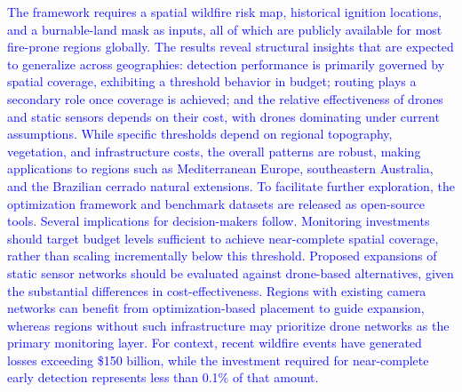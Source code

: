 \documentclass[pdflatex,sn-mathphys-num]{sn-jnl}%
\theoremstyle{thmstyleone}%
\theoremstyle{thmstyletwo}%
\theoremstyle{thmstylethree}%
\newcommand{\blue}[1]{\textcolor{blue}{#1}}
\begin{document}
\blue{The framework requires a spatial wildfire risk map, historical ignition locations, and a burnable-land mask as inputs, all of which are publicly available for most fire-prone regions globally. The results reveal structural insights that are expected to generalize across geographies: detection performance is primarily governed by spatial coverage, exhibiting a threshold behavior in budget; routing plays a secondary role once coverage is achieved; and the relative effectiveness of drones and static sensors depends on their cost, with drones dominating under current assumptions. While specific thresholds depend on regional topography, vegetation, and infrastructure costs, the overall patterns are robust, making applications to regions such as Mediterranean Europe, southeastern Australia, and the Brazilian cerrado natural extensions. To facilitate further exploration, the optimization framework and benchmark datasets are released as open-source tools. Several implications for decision-makers follow. Monitoring investments should target budget levels sufficient to achieve near-complete spatial coverage, rather than scaling incrementally below this threshold. Proposed expansions of static sensor networks should be evaluated against drone-based alternatives, given the substantial differences in cost-effectiveness. Regions with existing camera networks can benefit from optimization-based placement to guide expansion, whereas regions without such infrastructure may prioritize drone networks as the primary monitoring layer. For context, recent wildfire events have generated losses exceeding \$150 billion, while the investment required for near-complete early detection represents less than 0.1\% of that amount.}




\end{document}

